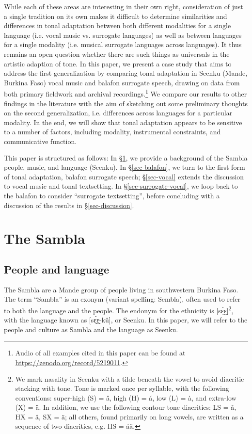 \documentclass[output=paper]{langscibook}
\begin{document}
While each of these areas are interesting in their own right, consideration of just a single tradition on its own makes it difficult to determine similarities and differences in tonal adaptation between both different modalities for a single language (i.e. vocal music vs. surrogate languages) as well as between languages for a single modality (i.e. musical surrogate languages across languages). It thus remains an open question whether there are such things as universals in the artistic adaption of tone. In this paper, we present a case study that aims to address the first generalization by comparing tonal adaptation in Seenku (Mande, Burkina Faso) vocal music and balafon surrogate speech, drawing on data from both primary fieldwork and archival recordings.\footnote{Audio of all examples cited in this paper can be found at \url{https://zenodo.org/record/5219011}.} We compare our results to other findings in the literature with the aim of sketching out some preliminary thoughts on the second generalization, i.e. differences across languages for a particular modality. In the end, we will show that tonal adaptation appears to be sensitive to a number of factors, including modality, instrumental constraints, and communicative function. 

This paper is structured as follows: In \S\ref{sec-Sambla}, we provide a background of the Sambla people, music, and language (Seenku). In \S\ref{sec-balafon}, we turn to the first form of tonal adaptation, balafon surrogate speech; \S\ref{sec-vocal} extends the discussion to vocal music and tonal textsetting. In \S\ref{sec-surrogate-vocal}, we loop back to the balafon to consider ``surrogate textsetting'', before concluding with a discussion of the results in \S\ref{sec-discussion}. 


\section{The Sambla}\label{sec-Sambla}

\subsection{People and language}

The Sambla are a Mande group of people living in southwestern Burkina Faso. The term ``Sambla'' is an exonym (variant spelling: Sembla), often used to refer to both the language and the people. The endonym for the ethnicity is [sɛ̰́ɛ̰]\footnote{We mark nasality in Seenku with a tilde beneath the vowel to avoid diacritic stacking with tone. Tone is marked once per syllable, with the following conventions: super-high (S) = a̋, high (H) = á, low (L) = à, and extra-low (X) = ȁ. In addition, we use the following contour tone diacritics: LS = ǎ, HX = â, SX = ä; all others, found primarily on long vowels, are written as a sequence of two diacritics, e.g. HS = áa̋.}, with the language known as [sɛ̰́ɛ̰-kû], or Seenku. In this paper, we will refer to the people and culture as Sambla and the language as Seenku. 
\end{document}
